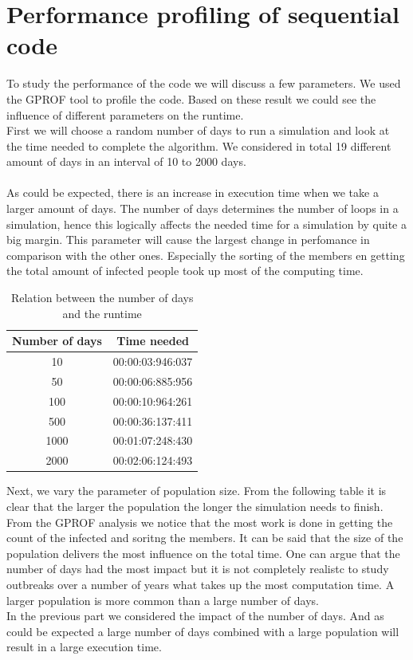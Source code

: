 \documentclass[runningheads]{llncs}
\begin{document}
\newpage
\section{Performance profiling of sequential code}
To study the performance of the code we will discuss a few parameters. We used the GPROF tool to profile the code. Based on these result we could see the influence of different parameters on the runtime.
\\
First we will choose a random number of days to run a simulation and look at the time needed to complete the algorithm. We considered in total 19 different amount of days in an interval of 10 to 2000 days. \\ 
\\
As could be expected, there is an increase in execution time when we take a larger amount of days. The number of days determines the number of loops in a simulation, hence this logically affects the needed time for a simulation by quite a big margin. This parameter will cause the largest change in perfomance in comparison with the other ones. Especially the sorting of the members en getting the total amount of infected people took up most of the computing time.

\begin{table}
\caption{Relation between the number of days and the runtime}
\begin{center}
	\begin{tabular}{ | c | c |}
	\hline
	Number of days & Time needed \\ \hline
	10 & 00:00:03:946:037 \\ \hline
	50 & 00:00:06:885:956 \\ \hline
	100 & 00:00:10:964:261 \\ \hline
	500 & 00:00:36:137:411 \\ \hline
	1000 & 00:01:07:248:430 \\ \hline
	2000 & 00:02:06:124:493 \\
	\hline	
	\end{tabular}
\end{center}
\end{table}

\noindent
Next, we vary the parameter of population size. From the following table it is clear that the larger the population the longer the simulation needs to finish. From the GPROF analysis we notice that the most work is done in getting the count of the infected and soritng the members. It can be said that the size of the population delivers the most influence on the total time. One can argue that the number of days had the most impact but it is not completely realistc to study outbreaks over a number of years what takes up the most computation time. A larger population is more common than a large number of days.
\\
In the previous part we considered the impact of the number of days. And as could be expected a large number of days combined with a large population will result in a large execution time.
\end{document}
